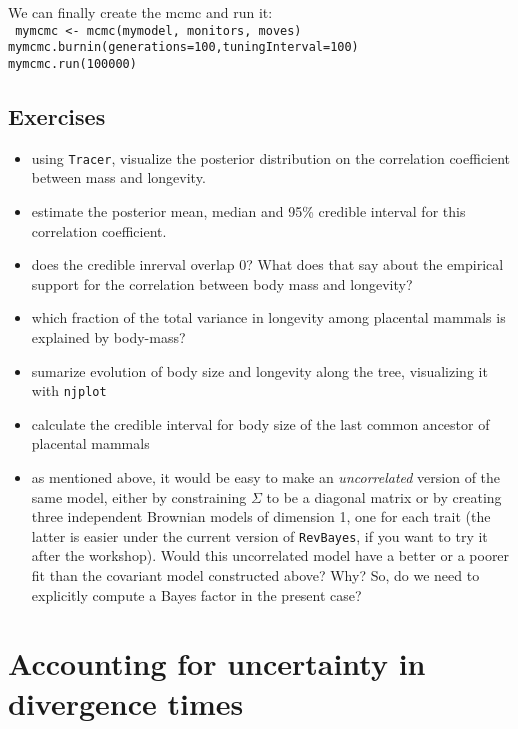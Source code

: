 \documentclass[usletter]{article}
\newcommand{\cmd}[1]{\texttt{#1}}
\begin{document}
We can finally create the mcmc and run it:
\\
\cmd{
mymcmc <- mcmc(mymodel, monitors, moves)
\\
mymcmc.burnin(generations=100,tuningInterval=100)
\\
mymcmc.run(100000)
}

\subsection*{Exercises}

\begin{itemize}
\item
using \cmd{Tracer}, visualize the posterior distribution on the correlation coefficient between mass and longevity.
\item
estimate the posterior mean, median and 95\% credible interval for this correlation coefficient.
\item
does the credible inrerval overlap 0? What does that say about the empirical support for the correlation between body mass and longevity?
\item
which fraction of the total variance in longevity among placental mammals is explained by body-mass?
\item
sumarize evolution of body size and longevity along the tree, visualizing it with \cmd{njplot}
\item
calculate the credible interval for body size of the last common ancestor of placental mammals
\item
as mentioned above, it would be easy to make an \emph{uncorrelated} version of the same model, either by constraining $\Sigma$ to be a diagonal matrix or by creating three independent Brownian models of dimension 1, one for each trait (the latter is easier under the current version of \cmd{RevBayes}, if you want to try it after the workshop). Would this uncorrelated model have a better or a poorer fit than the covariant model constructed above? Why?
So, do we need to explicitly compute a Bayes factor in the present case?
\end{itemize}


\section{Accounting for uncertainty in divergence times}
\end{document}
